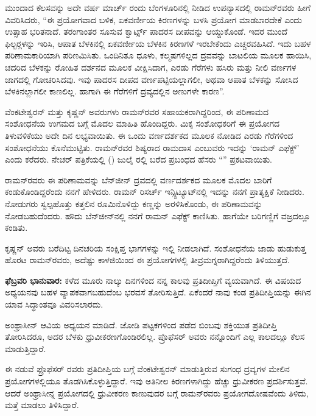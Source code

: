 ಮುಂದಾದ ಕೆಲಸವನ್ನು ಅದೇ ವರ್ಷ ಮಾರ್ಚ್  ರಂದು ಬೆಂಗಳೂರಿನಲ್ಲಿ ನೀಡಿದ ಉಪನ್ಯಾಸದಲ್ಲಿ ರಾಮನ್‍ರವರು ಹೀಗೆ ವಿವರಿಸಿದರು, “ಈ ಪ್ರಯೋಗವಾದ ಬಳಿಕ, ಏಕವರ್ಣೀಯ ಕಿರಣಗಳನ್ನು ಬಳಸಿ ಪ್ರಯೋಗ ಮಾಡಬಾರದೇಕೆ ಎಂದು ಉತ್ಸಾಹ ಭರಿತನಾದೆ.  ತರಂಗಾಂತರ ಸೂಸುವ ಕ್ವಾರ್ಟ್ಸ್ ಪಾದರಸ ದೀಪವನ್ನು ಆಯ್ದುಕೊಂಡೆ. ಇದರ ಮುಂದೆ ಫಿಲ್ಟರ್‍ಗಳನ್ನು ಇರಿಸಿ, ಆಪಾತ ಬೆಳಕಿನಲ್ಲಿ ಏಕವರ್ಣೀಯ ಬೆಳಕಿನ ಕಿರಣಗಳೆ ಇರಬೇಕೆಂದು ಎಚ್ಚರವಹಿಸಿದೆ. ಇದು ಬಹಳ ಪರಿಣಾಮಕಾರಿಯಾಗಿ ಪರಿಣಮಿಸಿತು. ಒಂದಿನಿತೂ ಧೂಳು, ಕಲ್ಮಷಗಳಿಲ್ಲದ ದ್ರವವನ್ನು ಬಾಟಲಿಯ ಮೂಲಕ ಹಾಯಿಸಿ, ಚದರಿದ ಬೆಳಕನ್ನು ರೋಹಿತ ದರ್ಶನದ ಮೂಲಕ ವೀಕ್ಷಿಸಿದಾಗ, ಎರಡು ಗೆರೆಗಳು ಹಸಿರು ಮತ್ತು ನೀಲಿ ವರ್ಣಗಳ ಜಾಗದಲ್ಲಿ ಗೋಚರಿಸಿದವು. ಇವು ಪಾದರಸ ದೀಪದ ವರ್ಣಪಟ್ಟಿಯಲ್ಲಾಗಲೀ, ಅಥವಾ ಆಪಾತ ಬೆಳಕನ್ನು ಸೋಸಿದ ಬೆಳಕಿನಲ್ಲಾಗಲೀ ಕಾಣಲಿಲ್ಲ. ಹಾಗಾಗಿ ಈ ಗೆರೆಗಳಿಗೆ ದ್ರವ್ಯದಲ್ಲಿನ ಅಣುಗಳೇ ಕಾರಣ”.

ವೆಂಕಟೇಶ್ವರನ್ ಮತ್ತು ಕೃಷ್ಣನ್ ಅವರುಗಳು ರಾಮನ್‍ರವರ ಸಹಾಯಕರಾಗಿದ್ದರಿಂದ, ಈ ಪರಿಣಾಮದ ಸಂಶೋಧನೆಯ ಉಗಮದ ಬಗ್ಗೆ ಮೊದಲ ಮಾಹಿತಿ ಹೊಂದಿದ್ದರು. ಮಿಕ್ಕ ಸಂಶೋಧಕರಿಗೆ ಈ ಪ್ರಯೋಗದ ತಿಳುವಳಿಕೆಯು ಅದೇ ದಿನ ಲಭ್ಯವಾಯಿತು. ಈ ಒಂದು ವರ್ಣದರ್ಶಕದ ಮೂಲಕ ನೋಡಿದ ಎರಡು ಗೆರೆಗಳಿಂದ ಸಂಶೋಧನೆಯು ಕೊನೆಮುಟ್ಟಿತು. ರಾಮನ್‍ರವರ ಶಿಷ್ಯರಾದ ರಾಮದಾಸ ಎಂಬುವರು ಇದನ್ನು ‘ರಾಮನ್ ಎಫೆಕ್ಟ್’ ಎಂದು ಕರೆದರು. ನೇಚರ್ ಪತ್ರಿಕೆಯಲ್ಲಿ () ಜುಲೈ ರಲ್ಲಿ ಬರೆದ ಪ್ರಬಂಧದ ಹೆಸರು “\textit{}” ಪ್ರಕಟವಾಯಿತು. 

ರಾಮನ್‍ರವರು ಈ ಪರಿಣಾಮವನ್ನು ಬೆನ್‍ಜೀನ್ ದ್ರವದಲ್ಲಿ ವರ್ಣದರ್ಶಕದ ಮೂಲಕ ಮೊದಲ ಬಾರಿಗೆ ಕಂಡುಕೊಂಡಿದ್ದರೆಂದು ನನಗೆ ಹೇಳಿದರು. ರಾಮನ್ ರಿಸರ್ಚ್ ಇನ್ಸ್ಟಿಟ್ಯೂಟ್‍ನಲ್ಲಿ ಇದನ್ನು ನನಗೆ ಪ್ರಾತ್ಯಕ್ಷಿಕೆ ನೀಡಿದರು. ನೋಡುಗರು ಸ್ವಲ್ಪಹೊತ್ತು ಕತ್ತಲಿನ ರೂಮಿನೊಳಿದ್ದು ಕಣ್ಣನ್ನು ಅರಳಿಸಿಕೊಂಡು, ಈ ಪರಿಣಾಮವನ್ನು ನೋಡಬಹುದೆಂದರು. ಹೌದು ಬೆನ್‍ಜೀನ್‍ನಲ್ಲಿ ನನಗೆ ರಾಮನ್ ಎಫೆಕ್ಟ್ ಕಾಣಿಸಿತು. ಹಾಗೆಯೇ ಬರಿಗಣ್ಣಿಗೆ ವಜ್ರದಲ್ಲೂ ಕಂಡಿತು.

\newpage

ಕೃಷ್ಣನ್ ಅವರು ಬರೆದಿಟ್ಟ ದಿನಚರಿಯ ಸಂಕ್ಷಿಪ್ತ ಭಾಗಗಳನ್ನು ಇಲ್ಲಿ ನೀಡಲಾಗಿದೆ. ಸಂಶೋಧನೆಯ ಜಾಡು ಹುಡುಕುತ್ತ ಹೊರಟ ರಾಮನ್‍ರವರು, ಅದೆಷ್ಟು ಕಾಳಜಿಯಿಂದ ಈ ಪ್ರಯೋಗಗಳಲ್ಲಿ ತೀವ್ರಮಗ್ನರಾಗಿದ್ದರೆಂದು ತಿಳಿಯುತ್ತದೆ.

\textbf{ಫೆಬ್ರವರಿ  ಭಾನುವಾರ:} ಕಳೆದ ಮೂರು ನಾಲ್ಕು ದಿನಗಳಿಂದ ನನ್ನ ಕಾಲವು ಪ್ರತಿದೀಪ್ತಿಗೆ ವ್ಯಯವಾಗಿದೆ. ಈ ವಿಷಯದ ಅಧ್ಯಯನವು ಬಹಳ ವ್ಯಾಪಕವಾಗಬಹುದೆಂಬ ಭರವಸೆ ತೋರಿಸುತ್ತಿದೆ. ಏಕೆಂದರೆ ನಾವು ಕಂಡ ಪ್ರತಿದೀಪ್ತಿಯನ್ನು ಈಗಿನ ಯಾವ ಸಿದ್ಧಾಂತವೂ ವಿವರಿಸಲಾರದು.

ಅಂಥ್ರಾಸೀನ್ ಆವಿಯ ಅಧ್ಯಯನ ಮಾಡಿದೆ. ಜೋಡಿ ಪಟ್ಟಕಗಳಿಂದ ಪಡೆದ ಬಿಂಬವು ಶಕ್ತಿಯುತ ಪ್ರತಿದೀಪ್ತಿ ತೋರಿಸಿದರೂ, ಅದರ ಬೆಳಕು ಧ್ರುವೀಕರಣಗೊಂಡಿರಲಿಲ್ಲ. ಪ್ರೊಫೆಸರ್ ಅವರು ನನ್ನೊಂದಿಗೆ ಎಲ್ಲ ಕಾಲದಲ್ಲೂ ಕೆಲಸ ಮಾಡುತ್ತಿದ್ದಾರೆ.

ಈ ನಡುವೆ ಫ್ರೊಫೆಸರ್ ರವರು ಪ್ರತಿದೀಪ್ತಿಯ ಬಗ್ಗೆ ವೆಂಕಟೇಶ್ವರನ್ ಮಾಡುತ್ತಿರುವ ಸುಗಂಧ ದ್ರವ್ಯಗಳ ಮೇಲಿನ ಪ್ರಯೋಗಗಳಲ್ಲಿಯೂ ತೊಡಗಿಸಿಕೊಳ್ಳುತ್ತಿದ್ದಾರೆ. ಇವು ಅತಿನೀಲ ಕಿರಣಗಳಾಗಿದ್ದು ಹೆಚ್ಚು ಧ್ರುವೀಕರಣ ಪ್ರದರ್ಶಿಸುತ್ತವೆ. ಆದರೆ ಅಂಥ್ರಾಸೀನ್ನ ಪ್ರಯೋಗದಲ್ಲಿ ಧ್ರುವೀಕರಣ ಕಾಣುವುದರ ಬಗ್ಗೆ ರಾಮನ್‍ರವರು ಪ್ರಯೋಗದೋಷವೆಂದು ತಿಳಿದು, ಮತ್ತೆ ಮಾಡಲು ತಿಳಿಸಿದ್ದಾರೆ.

